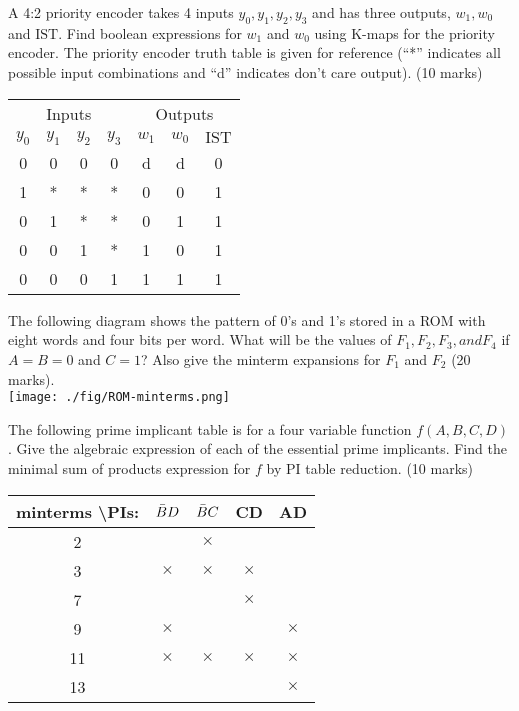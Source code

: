 \begin{prob}
  A 4:2 priority encoder takes 4 inputs $y_0, y_1, y_2, y_3$ and has three outputs, $w_1, w_0$ and $\text{IST}$. Find boolean expressions for $w_1$ and $w_0$ using K-maps for the priority encoder. The priority encoder truth table is given for reference (``*'' indicates all possible input combinations and ``d'' indicates don't care output). (10 marks) \\
  \begin{tabular}{cccc|ccc}
    \toprule
    \multicolumn{4}{c|}{Inputs} & \multicolumn{3}{c}{Outputs}\\
    $y_0$ & $y_1$ & $y_2$ & $y_3$ & $w_1$ & $w_0$ & $\text{IST}$ \\
    \midrule
    0 & 0 & 0 & 0 & d & d & 0\\
    1 & * & * & * & 0 & 0 & 1\\
    0 & 1 & * & * & 0 & 1 & 1\\
    0 & 0 & 1 & * & 1 & 0 & 1\\
    0 & 0 & 0 & 1 & 1 & 1 & 1\\
    \midrule
  \end{tabular}
\end{prob}

\begin{prob}
  The following diagram shows the pattern of 0’s and 1’s stored in a ROM
  with eight words and four bits per word. What will be the values of $F_1 , F_2 ,
  F_3 , and F_4$ if $A= B = 0$ and $C = 1$?
  Also give the minterm expansions for $F_1$ and $F_2$ (20 marks).\\
  \texttt{[image: ./fig/ROM-minterms.png]}
\end{prob}

\begin{prob}
  The following prime implicant table is for a four variable function $f(A, B,
  C, D)$.
  Give the algebraic expression of each of the essential prime implicants. Find
  the minimal sum of products expression for $f$ by PI table reduction. (10 marks)
  \\
  \begin{tabular}{ccccc}
    \toprule
    minterms \textbackslash PIs: & $\bar{B} D$ & $\bar{B} C$ & CD & AD  \\
    \midrule
    2  &   & $\times$ & & \\
    3  & $\times$ & $\times$ & $\times$ & \\ 
    7  &  & & $\times$ & \\ 
    9  & $\times$ & & & $\times$ \\ 
    11 & $\times$ & $\times$ & $\times$ & $\times$ \\ 
    13 &  & & & $\times$ \\
    \bottomrule
  \end{tabular}\\
\end{prob}

